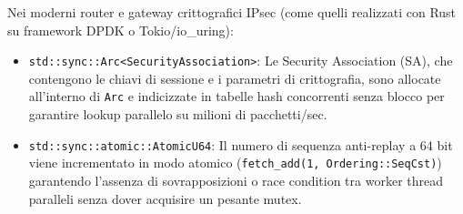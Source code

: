 \documentclass[11pt,a4paper]{article}
\begin{document}
\begin{altbox}
Nei moderni router e gateway crittografici IPsec (come quelli realizzati con Rust su framework DPDK o Tokio/io\_uring):
\begin{itemize}
    \item \texttt{std::sync::Arc<SecurityAssociation>}: Le Security Association (SA), che contengono le chiavi di sessione e i parametri di crittografia, sono allocate all'interno di \texttt{Arc} e indicizzate in tabelle hash concorrenti senza blocco per garantire lookup parallelo su milioni di pacchetti/sec.
    \item \texttt{std::sync::atomic::AtomicU64}: Il numero di sequenza anti-replay a 64 bit viene incrementato in modo atomico (\texttt{fetch\_add(1, Ordering::SeqCst)}) garantendo l'assenza di sovrapposizioni o race condition tra worker thread paralleli senza dover acquisire un pesante mutex.
\end{itemize}
\end{altbox}
\end{document}
